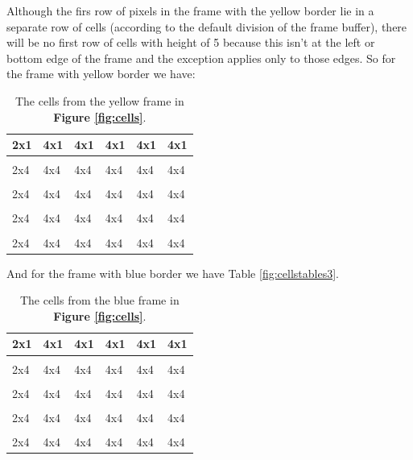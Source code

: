 	
Although the firs row of pixels in the frame with the yellow border lie in a 
separate row of cells (according to the default division of the frame buffer), 
there will be no first row of cells with height of 5 because this isn't at the 
left or bottom edge of the frame and the exception applies only to those edges. 
So for the frame with yellow border we have:

\begin{table}[!h]
	\centering
	\begin{tabular}{|p{0.6cm}|p{1cm}|p{1cm}|p{1cm}|p{1cm}|p{1.2cm}|}
		\hline
		2x1 & 4x1 & 4x1 & 4x1 & 4x1 & 4x1 \\
		\hline
		& & & & & \\[0.5cm]
		2x4 & 4x4 & 4x4 & 4x4 & 4x4 & 4x4 \\
		\hline
		& & & & & \\[0.5cm]
		2x4 & 4x4 & 4x4 & 4x4 & 4x4 & 4x4 \\
		\hline
		& & & & & \\[0.5cm]
		2x4 & 4x4 & 4x4 & 4x4 & 4x4 & 4x4 \\
		\hline
		& & & & & \\[0.5cm]
		2x4 & 4x4 & 4x4 & 4x4 & 4x4 & 4x4 \\
		\hline
	\end{tabular}
	\label{fig:cellstable2}
	\caption{ 
		The cells from the yellow frame in \textbf{Figure \ref{fig:cells}}.  
	}
\end{table}


	
And for the frame with blue border we have Table \ref{fig:cellstables3}.

\begin{table}[!h]
	\centering
	\begin{tabular}{|p{0.4cm}|p{1cm}|p{1cm}|p{1cm}|p{1cm}|p{1cm}|}
		\hline
		2x1 & 4x1 & 4x1 & 4x1 & 4x1 & 4x1 \\
		\hline
		& & & & & \\[0.5cm]
		2x4 & 4x4 & 4x4 & 4x4 & 4x4 & 4x4 \\
		\hline
		& & & & & \\[0.5cm]
		2x4 & 4x4 & 4x4 & 4x4 & 4x4 & 4x4 \\
		\hline
		& & & & & \\[0.5cm]
		2x4 & 4x4 & 4x4 & 4x4 & 4x4 & 4x4 \\
		\hline
		& & & & & \\[0.5cm]
		2x4 & 4x4 & 4x4 & 4x4 & 4x4 & 4x4 \\
		\hline
	\end{tabular}
	\label{fig:cellstable3}
	\caption{ 
		The cells from the blue frame in \textbf{Figure \ref{fig:cells}}.  
	}
\end{table}


